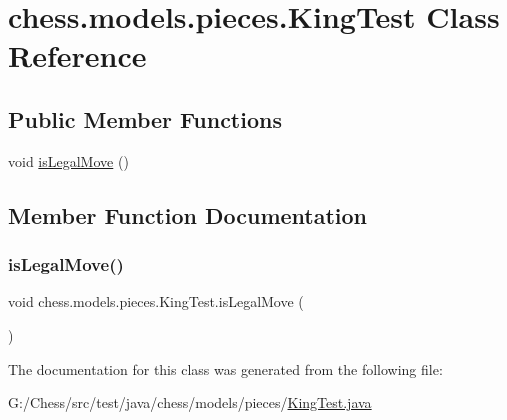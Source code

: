 \hypertarget{classchess_1_1models_1_1pieces_1_1_king_test}{}\section{chess.\+models.\+pieces.\+King\+Test Class Reference}
\label{classchess_1_1models_1_1pieces_1_1_king_test}
\subsection*{Public Member Functions}
\begin{DoxyCompactItemize}
\item 
void \mbox{\hyperlink{classchess_1_1models_1_1pieces_1_1_king_test_afbd1263f341c3f9420e09a7d5b08bc69}{is\+Legal\+Move}} ()
\end{DoxyCompactItemize}


\subsection{Member Function Documentation}
\mbox{\label{classchess_1_1models_1_1pieces_1_1_king_test_afbd1263f341c3f9420e09a7d5b08bc69}} 
\subsubsection{\texorpdfstring{is\+Legal\+Move()}{isLegalMove()}}
{\footnotesize\ttfamily void chess.\+models.\+pieces.\+King\+Test.\+is\+Legal\+Move (\begin{DoxyParamCaption}{ }\end{DoxyParamCaption})}



The documentation for this class was generated from the following file\+:\begin{DoxyCompactItemize}
\item 
G\+:/\+Chess/src/test/java/chess/models/pieces/\mbox{\hyperlink{_king_test_8java}{King\+Test.\+java}}\end{DoxyCompactItemize}
